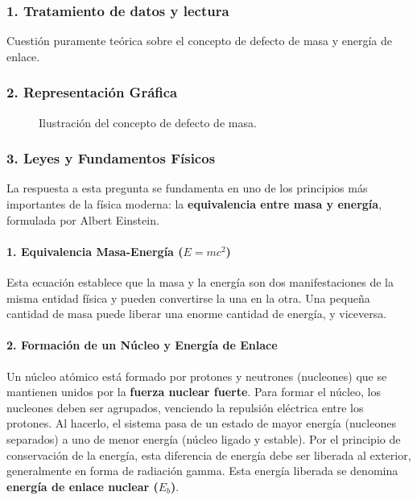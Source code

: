 \subsubsection*{1. Tratamiento de datos y lectura}
Cuestión puramente teórica sobre el concepto de defecto de masa y energía de enlace.

\subsubsection*{2. Representación Gráfica}
\begin{figure}[H]
    \centering
    \caption{Ilustración del concepto de defecto de masa.}
\end{figure}

\subsubsection*{3. Leyes y Fundamentos Físicos}
La respuesta a esta pregunta se fundamenta en uno de los principios más importantes de la física moderna: la \textbf{equivalencia entre masa y energía}, formulada por Albert Einstein.

\paragraph{1. Equivalencia Masa-Energía ($E=mc^2$)}
Esta ecuación establece que la masa y la energía son dos manifestaciones de la misma entidad física y pueden convertirse la una en la otra. Una pequeña cantidad de masa puede liberar una enorme cantidad de energía, y viceversa.

\paragraph{2. Formación de un Núcleo y Energía de Enlace}
Un núcleo atómico está formado por protones y neutrones (nucleones) que se mantienen unidos por la \textbf{fuerza nuclear fuerte}. Para formar el núcleo, los nucleones deben ser agrupados, venciendo la repulsión eléctrica entre los protones. Al hacerlo, el sistema pasa de un estado de mayor energía (nucleones separados) a uno de menor energía (núcleo ligado y estable).
Por el principio de conservación de la energía, esta diferencia de energía debe ser liberada al exterior, generalmente en forma de radiación gamma. Esta energía liberada se denomina \textbf{energía de enlace nuclear ($E_b$)}.

